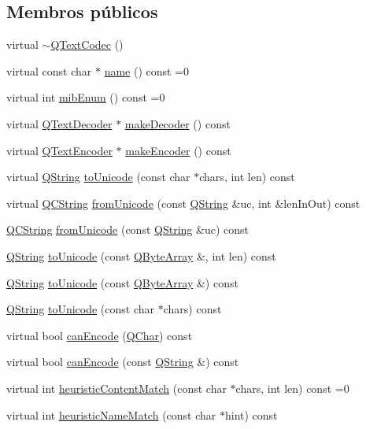 \subsection*{Membros públicos}
\begin{DoxyCompactItemize}
\item 
virtual \hyperlink{class_q_text_codec_ac5495a5f3039c2f23cec51d6213d644b}{$\sim$\-Q\-Text\-Codec} ()
\item 
virtual const char $\ast$ \hyperlink{class_q_text_codec_a5bf2c67878639a29dfd3d648b93f17a2}{name} () const =0
\item 
virtual int \hyperlink{class_q_text_codec_a6ab5696c11fafa78429074ae63a794e0}{mib\-Enum} () const =0
\item 
virtual \hyperlink{class_q_text_decoder}{Q\-Text\-Decoder} $\ast$ \hyperlink{class_q_text_codec_ad7f6bd53bcbf64bf6f2e75106d229e19}{make\-Decoder} () const 
\item 
virtual \hyperlink{class_q_text_encoder}{Q\-Text\-Encoder} $\ast$ \hyperlink{class_q_text_codec_af324249beeb8b0b38aa7b32ba7c8c09f}{make\-Encoder} () const 
\item 
virtual \hyperlink{class_q_string}{Q\-String} \hyperlink{class_q_text_codec_a007974789d47a38acb95816cd5486c8c}{to\-Unicode} (const char $\ast$chars, int len) const 
\item 
virtual \hyperlink{class_q_c_string}{Q\-C\-String} \hyperlink{class_q_text_codec_a2c6f9097505dec2780031e680be1c835}{from\-Unicode} (const \hyperlink{class_q_string}{Q\-String} \&uc, int \&len\-In\-Out) const 
\item 
\hyperlink{class_q_c_string}{Q\-C\-String} \hyperlink{class_q_text_codec_a22e200a8189e9a677952aa61317b0f93}{from\-Unicode} (const \hyperlink{class_q_string}{Q\-String} \&uc) const 
\item 
\hyperlink{class_q_string}{Q\-String} \hyperlink{class_q_text_codec_a1edbfeeaa16367bebc40d10b58629e30}{to\-Unicode} (const \hyperlink{class_q_array}{Q\-Byte\-Array} \&, int len) const 
\item 
\hyperlink{class_q_string}{Q\-String} \hyperlink{class_q_text_codec_af8c1f623c901f40acc92bd81fd777df3}{to\-Unicode} (const \hyperlink{class_q_array}{Q\-Byte\-Array} \&) const 
\item 
\hyperlink{class_q_string}{Q\-String} \hyperlink{class_q_text_codec_a5c3d28eaf35d1ca47d749f9a46bf647f}{to\-Unicode} (const char $\ast$chars) const 
\item 
virtual bool \hyperlink{class_q_text_codec_ae1c8923dc21dd8ea773fe3e4f31f526f}{can\-Encode} (\hyperlink{class_q_char}{Q\-Char}) const 
\item 
virtual bool \hyperlink{class_q_text_codec_a9c799d3c7b5aad173030315d83090e35}{can\-Encode} (const \hyperlink{class_q_string}{Q\-String} \&) const 
\item 
virtual int \hyperlink{class_q_text_codec_a75f854c61b4c3535f1456db42a014f7a}{heuristic\-Content\-Match} (const char $\ast$chars, int len) const =0
\item 
virtual int \hyperlink{class_q_text_codec_a7fb3e310dd10564c6a7e2b707a336bbf}{heuristic\-Name\-Match} (const char $\ast$hint) const 
\end{DoxyCompactItemize}
